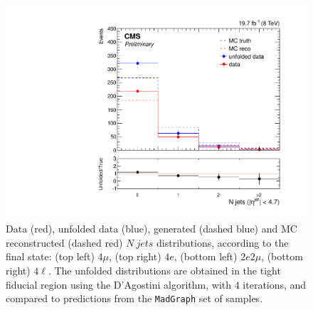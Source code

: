 \begin{figure}[hbtp]
\begin{center}
    \includegraphics[width=\cmsFigWidth]{Figures/Jets_ZZTo4l_Mad_fr}    
    \caption{\footnotesize{Data (red), unfolded data (blue), generated (dashed blue) and MC reconstructed (dashed red) $N\ jets$ distributions, according to the final state: (top left) $4\mu$, (top right) $4e$, (bottom left) $2e2\mu$, (bottom right) $4\ell$. The unfolded distributions are obtained in the tight fiducial region using the D'Agostini algorithm, with 4 iterations, and compared to predictions from the \texttt{MadGraph} set of samples.}} 
    \label{fig:Jets_unfolding}
  \end{center}
\end{figure}


